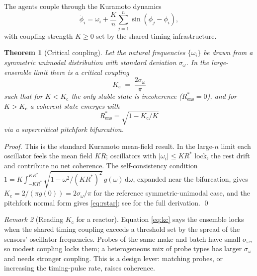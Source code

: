 \documentclass[11pt,a4paper,twocolumn]{article}
\theoremstyle{thmstyle}
\newtheorem{theorem}{Theorem}[section]
\theoremstyle{definition}
\theoremstyle{remark}
\newtheorem{remark}[theorem]{Remark}
\newcommand{\Rens}{R_{\mathrm{ens}}}
\newcommand{\Kc}{K_{\mathrm{c}}}
\newcommand{\abs}[1]{\lvert#1\rvert}
\begin{document}
The agents couple through the Kuramoto
dynamics~\citep{kuramoto1984chemical,strogatz2000kuramoto}
\begin{equation}
\label{eq:kuramoto}
\dot\phi_i=\omega_i+\frac{K}{n}\sum_{j=1}^{n}\sin(\phi_j-\phi_i),
\end{equation}
with coupling strength $K\ge0$ set by the shared timing infrastructure.

\begin{theorem}[Critical coupling]
\label{thm:critical}
Let the natural frequencies $\{\omega_i\}$ be drawn from a symmetric
unimodal distribution with standard deviation $\sigma_\omega$. In the
large-ensemble limit there is a critical coupling
\begin{equation}
\label{eq:kc}
\Kc\;=\;\frac{2\sigma_\omega}{\pi}
\end{equation}
such that for $K<\Kc$ the only stable state is incoherence
($\Rens^{\ast}=0$), and for $K>\Kc$ a coherent state emerges with
\begin{equation}
\label{eq:rstar}
\Rens^{\ast}=\sqrt{1-\Kc/K}
\end{equation}
via a supercritical pitchfork bifurcation.
\end{theorem}

\begin{proof}
This is the standard Kuramoto mean-field result. In the large-$n$ limit
each oscillator feels the mean field $KR$; oscillators with
$\abs{\omega_i}\le KR^{\ast}$ lock, the rest drift and contribute no net
coherence. The self-consistency condition
$1=K\!\int_{-KR^{\ast}}^{KR^{\ast}}\!\sqrt{1-\omega^2/(KR^{\ast})^2}\,g(\omega)\,\mathrm d\omega$,
expanded near the bifurcation, gives $\Kc=2/(\pi g(0))=2\sigma_\omega/\pi$
for the reference symmetric-unimodal case, and the pitchfork normal form
gives \eqref{eq:rstar}; see \citet{strogatz2000kuramoto,acebron2005kuramoto}
for the full derivation. \qed
\end{proof}

\begin{remark}[Reading $\Kc$ for a reactor]
\label{rem:kc}
Equation \eqref{eq:kc} says the ensemble locks when the shared timing
coupling exceeds a threshold set by the spread of the sensors' oscillator
frequencies. Probes of the same make and batch have small
$\sigma_\omega$, so modest coupling locks them; a heterogeneous mix of
probe types has larger $\sigma_\omega$ and needs stronger coupling. This
is a design lever: matching probes, or increasing the timing-pulse rate,
raises coherence.
\end{remark}
\end{document}
